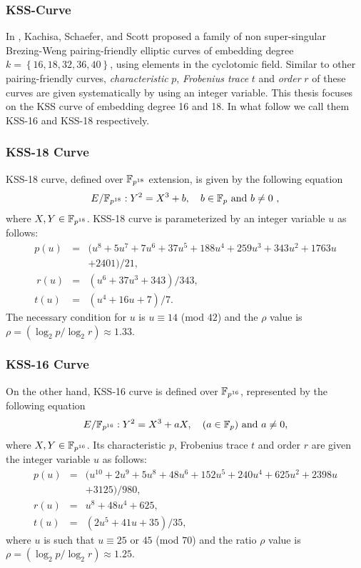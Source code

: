 \subsubsection{KSS-Curve}
In \cite{EPRINT:KacSchSco07}, Kachisa, Schaefer, and Scott proposed a family of non super-singular Brezing-Weng pairing-friendly elliptic curves of embedding degree $k = \left\lbrace16, 18, 32, 36, 40\right\rbrace$, using elements in the cyclotomic field. Similar to other pairing-friendly curves,  \textit{characteristic} $p$, \textit{Frobenius trace} $t$ and \textit{order} $r$ of these curves are given systematically by using an integer variable.
This thesis focuses on the KSS curve of embedding degree 16 and 18.
In what follow we call them KSS-16 and KSS-18 respectively.

\subsubsection*{KSS-18 Curve}
KSS-18 curve, defined over $\mathbb{F}_{p^{18}}$ extension, is given by the following equation
\begin{equation}
E/\mathbb{F}_{p^{18}}:Y^2=X^3+b, \quad \mbox{$b \in {\mathbb{F}}_{p}$ and $b \neq 0$ },
\end{equation}
where  $X,Y \in \mathbb{F}_{p^{18}}$. KSS-18 curve is parameterized by an integer variable $u$ as follows:
\begin{subequations}
	\begin{eqnarray}
	p(u)  &= &(u^8 +5u^7 +7u^6 +37u^5 +188u^4 +259u^3 + 343u^2 +1763u \nonumber \\
	& &   +2401)/21,              \\\
	r(u) & =&  (u^6 + 37u^3 + 343)/343,   \\
	t(u) &=&  (u^4 + 16u + 7)/7. 
	\end{eqnarray}
\end{subequations} 
The necessary condition for $u$ is $u \equiv 14$ (mod $42$) and the $\rho$ value is $\rho = (\log_2 p/\log_2 r) \approx 1.33$.

\subsubsection*{KSS-16 Curve}
On the other hand, KSS-16 curve is defined over $\mathbb{F}_{p^{16}}$, represented by the following equation
\begin{equation}
E/\mathbb{F}_{p^{16}}:Y^2=X^3+aX, \quad \mbox{($a \in {\mathbb{F}}_{p}$) and  $a \neq 0$},
\end{equation}
where $X,Y \in \mathbb{F}_{p^{16}}$. Its characteristic $p$, Frobenius trace $t$ and order $r$ are given the integer variable $u$ as follows:
\begin{subequations}
	\begin{eqnarray}
	p(u) &= & (u^{10} +2u^9 +5u^8 +48u^6 +152u^5 +240u^4 +625u^2 +2398u \nonumber \\
	&& +3125)/980,  \\
	r(u) &= & u^8 +48u^4 +625, \\
	t(u) &=& (2u^5 +41u+35)/35, 
	\end{eqnarray}
\end{subequations} 
where $u$ is such that $u \equiv 25$ or $45$ (mod $70$) and the ratio $\rho$ value is $\rho = (\log_2 p/\log_2 r) \approx 1.25$.

